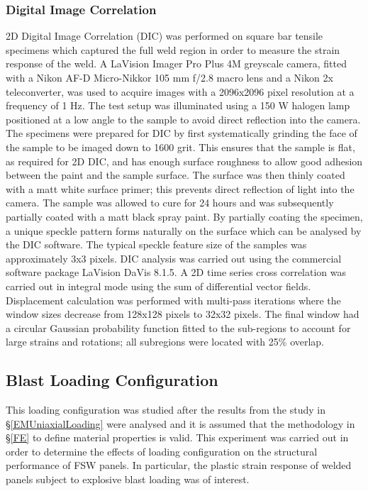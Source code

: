 \subsubsection{Digital Image Correlation}
\label{EMDIC}
2D Digital Image Correlation (DIC) was performed on square bar tensile specimens which captured the full weld region in order to measure the strain response of the weld. A LaVision Imager Pro Plus 4M greyscale camera, fitted with a Nikon AF-D Micro-Nikkor 105 mm f/2.8 macro lens and a Nikon 2x teleconverter, was used to acquire images with a 2096x2096 pixel resolution at a frequency of 1 Hz. The test setup was illuminated using a 150 W halogen lamp positioned at a low angle to the sample to avoid direct reflection into the camera. The specimens were prepared for DIC by first systematically grinding the face of the sample to be imaged down to 1600 grit. This ensures that the sample is flat, as required for 2D DIC, and has enough surface roughness to allow good adhesion between the paint and the sample surface. The surface was then thinly coated with a matt white surface primer; this prevents direct reflection of light into the camera. The sample was allowed to cure for 24 hours and was subsequently partially coated with a matt black spray paint. By partially coating the specimen, a unique speckle pattern forms naturally on the surface which can be analysed by the DIC software. The typical speckle feature size of the samples was approximately 3x3 pixels. DIC analysis was carried out using the commercial software package LaVision DaVis 8.1.5. A 2D time series cross correlation was carried out in integral mode using the sum of differential vector fields. Displacement calculation was performed with multi-pass iterations where the window sizes decrease from 128x128 pixels to 32x32 pixels. The final window had a circular Gaussian probability function fitted to the sub-regions to account for large strains and rotations; all subregions were located with 25\% overlap.
\subsection{Blast Loading Configuration}
\label{EMGeneralLoading}
This loading configuration was studied after the results from the study in \S\ref{EMUniaxialLoading} were analysed and it is assumed that the methodology in \S\ref{FE} to define material properties is valid. This experiment was carried out in order to determine the effects of loading configuration on the structural performance of FSW panels. In particular, the plastic strain response of welded panels subject to explosive blast loading was of interest. 
